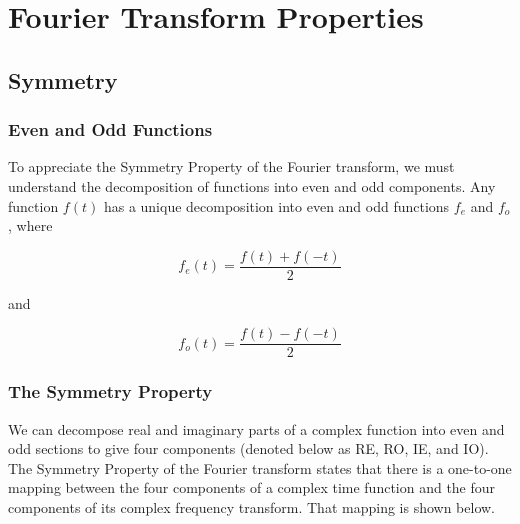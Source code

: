 \chapter{Fourier Transform Properties}

\section{Symmetry}

\subsection{Even and Odd Functions}

To appreciate the Symmetry Property of the Fourier transform, we must understand the decomposition of functions into even and odd components. Any function $f(t)$ has a unique decomposition into even and odd functions $f_e$ and $f_o$, where

\begin{equation}
	f_e(t) = \frac{f(t) + f(-t)}{2}
\end{equation}

and

\begin{equation}
	f_o(t) = \frac{f(t) - f(-t)}{2}
\end{equation}

\subsection{The Symmetry Property}

We can decompose real and imaginary parts of a complex function into even and odd sections to give four components (denoted below as RE, RO, IE, and IO). The Symmetry Property of the Fourier transform states that there is a one-to-one mapping between the four components of a complex time function and the four components of its complex frequency transform. That mapping is shown below.

\vspace{0.5cm}

